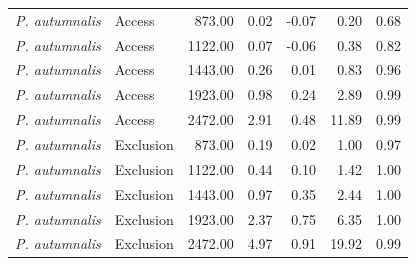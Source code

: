 \begin{tabular}{llrrrrr}
  \textit{P. autumnalis} & Access & 873.00 & 0.02 & -0.07 & 0.20 & 0.68 \\ 
  \textit{P. autumnalis} & Access & 1122.00 & 0.07 & -0.06 & 0.38 & 0.82 \\ 
  \textit{P. autumnalis} & Access & 1443.00 & 0.26 & 0.01 & 0.83 & 0.96 \\ 
  \textit{P. autumnalis} & Access & 1923.00 & 0.98 & 0.24 & 2.89 & 0.99 \\ 
  \textit{P. autumnalis} & Access & 2472.00 & 2.91 & 0.48 & 11.89 & 0.99 \\ 
  \textit{P. autumnalis} & Exclusion & 873.00 & 0.19 & 0.02 & 1.00 & 0.97 \\ 
  \textit{P. autumnalis} & Exclusion & 1122.00 & 0.44 & 0.10 & 1.42 & 1.00 \\ 
  \textit{P. autumnalis} & Exclusion & 1443.00 & 0.97 & 0.35 & 2.44 & 1.00 \\ 
  \textit{P. autumnalis} & Exclusion & 1923.00 & 2.37 & 0.75 & 6.35 & 1.00 \\ 
  \textit{P. autumnalis} & Exclusion & 2472.00 & 4.97 & 0.91 & 19.92 & 0.99 \\ 
   \hline
\end{tabular}